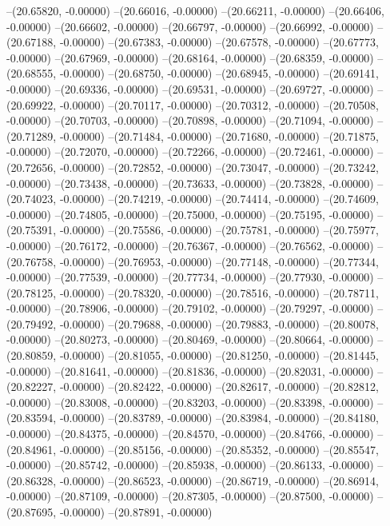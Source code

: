 --(20.65820, -0.00000)
--(20.66016, -0.00000)
--(20.66211, -0.00000)
--(20.66406, -0.00000)
--(20.66602, -0.00000)
--(20.66797, -0.00000)
--(20.66992, -0.00000)
--(20.67188, -0.00000)
--(20.67383, -0.00000)
--(20.67578, -0.00000)
--(20.67773, -0.00000)
--(20.67969, -0.00000)
--(20.68164, -0.00000)
--(20.68359, -0.00000)
--(20.68555, -0.00000)
--(20.68750, -0.00000)
--(20.68945, -0.00000)
--(20.69141, -0.00000)
--(20.69336, -0.00000)
--(20.69531, -0.00000)
--(20.69727, -0.00000)
--(20.69922, -0.00000)
--(20.70117, -0.00000)
--(20.70312, -0.00000)
--(20.70508, -0.00000)
--(20.70703, -0.00000)
--(20.70898, -0.00000)
--(20.71094, -0.00000)
--(20.71289, -0.00000)
--(20.71484, -0.00000)
--(20.71680, -0.00000)
--(20.71875, -0.00000)
--(20.72070, -0.00000)
--(20.72266, -0.00000)
--(20.72461, -0.00000)
--(20.72656, -0.00000)
--(20.72852, -0.00000)
--(20.73047, -0.00000)
--(20.73242, -0.00000)
--(20.73438, -0.00000)
--(20.73633, -0.00000)
--(20.73828, -0.00000)
--(20.74023, -0.00000)
--(20.74219, -0.00000)
--(20.74414, -0.00000)
--(20.74609, -0.00000)
--(20.74805, -0.00000)
--(20.75000, -0.00000)
--(20.75195, -0.00000)
--(20.75391, -0.00000)
--(20.75586, -0.00000)
--(20.75781, -0.00000)
--(20.75977, -0.00000)
--(20.76172, -0.00000)
--(20.76367, -0.00000)
--(20.76562, -0.00000)
--(20.76758, -0.00000)
--(20.76953, -0.00000)
--(20.77148, -0.00000)
--(20.77344, -0.00000)
--(20.77539, -0.00000)
--(20.77734, -0.00000)
--(20.77930, -0.00000)
--(20.78125, -0.00000)
--(20.78320, -0.00000)
--(20.78516, -0.00000)
--(20.78711, -0.00000)
--(20.78906, -0.00000)
--(20.79102, -0.00000)
--(20.79297, -0.00000)
--(20.79492, -0.00000)
--(20.79688, -0.00000)
--(20.79883, -0.00000)
--(20.80078, -0.00000)
--(20.80273, -0.00000)
--(20.80469, -0.00000)
--(20.80664, -0.00000)
--(20.80859, -0.00000)
--(20.81055, -0.00000)
--(20.81250, -0.00000)
--(20.81445, -0.00000)
--(20.81641, -0.00000)
--(20.81836, -0.00000)
--(20.82031, -0.00000)
--(20.82227, -0.00000)
--(20.82422, -0.00000)
--(20.82617, -0.00000)
--(20.82812, -0.00000)
--(20.83008, -0.00000)
--(20.83203, -0.00000)
--(20.83398, -0.00000)
--(20.83594, -0.00000)
--(20.83789, -0.00000)
--(20.83984, -0.00000)
--(20.84180, -0.00000)
--(20.84375, -0.00000)
--(20.84570, -0.00000)
--(20.84766, -0.00000)
--(20.84961, -0.00000)
--(20.85156, -0.00000)
--(20.85352, -0.00000)
--(20.85547, -0.00000)
--(20.85742, -0.00000)
--(20.85938, -0.00000)
--(20.86133, -0.00000)
--(20.86328, -0.00000)
--(20.86523, -0.00000)
--(20.86719, -0.00000)
--(20.86914, -0.00000)
--(20.87109, -0.00000)
--(20.87305, -0.00000)
--(20.87500, -0.00000)
--(20.87695, -0.00000)
--(20.87891, -0.00000)
